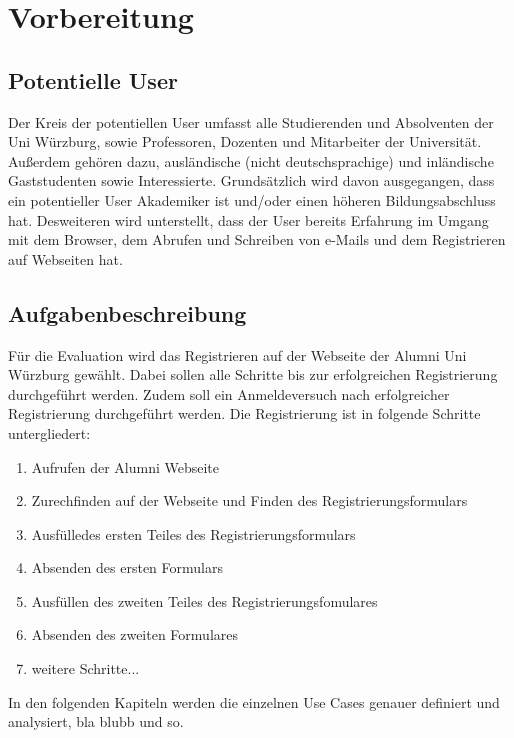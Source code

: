 ﻿\section{Vorbereitung}
\subsection{Potentielle User}
Der Kreis der potentiellen User umfasst alle Studierenden und Absolventen der Uni Würzburg, sowie Professoren, Dozenten und Mitarbeiter der Universität. Außerdem gehören dazu, ausländische (nicht deutschsprachige) und inländische Gaststudenten sowie Interessierte. Grundsätzlich wird davon ausgegangen, dass ein potentieller User Akademiker ist und/oder einen höheren Bildungsabschluss hat. Desweiteren wird unterstellt, dass der User bereits Erfahrung im Umgang mit dem Browser, dem Abrufen und Schreiben von e-Mails und dem Registrieren auf Webseiten hat. 

\subsection{Aufgabenbeschreibung}
Für die Evaluation wird das Registrieren auf der Webseite der Alumni Uni Würzburg gewählt. Dabei sollen alle Schritte bis zur erfolgreichen Registrierung durchgeführt werden. Zudem soll ein Anmeldeversuch nach erfolgreicher Registrierung durchgeführt werden.
Die Registrierung ist in folgende Schritte untergliedert:
\begin{enumerate}
	\item Aufrufen der Alumni Webseite
	\item Zurechfinden auf der Webseite und Finden des Registrierungsformulars
	\item Ausfülledes ersten Teiles des Registrierungsformulars
	\item Absenden des ersten Formulars
	\item Ausfüllen des zweiten Teiles des Registrierungsfomulares
	\item Absenden des zweiten Formulares
	\item weitere Schritte...
\end{enumerate}

In den folgenden Kapiteln werden die einzelnen Use Cases genauer definiert und analysiert, bla blubb und so.

